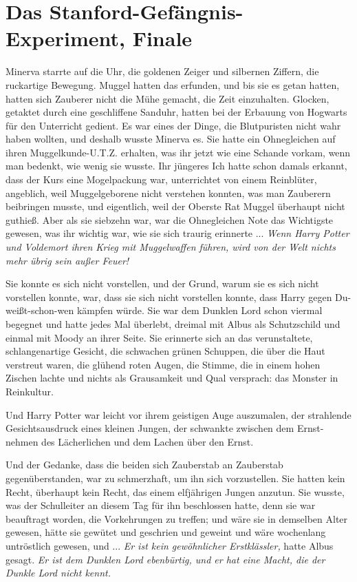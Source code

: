 \chapter{Das Stanford-Gefängnis-Experiment, Finale}

Minerva starrte auf die Uhr, die goldenen Zeiger und silbernen Ziffern, die
ruckartige Bewegung. Muggel hatten das erfunden, und bis sie es getan hatten,
hatten sich Zauberer nicht die Mühe gemacht, die Zeit einzuhalten. Glocken,
getaktet durch eine geschliffene Sanduhr, hatten bei der Erbauung von Hogwarts
für den Unterricht gedient. Es war eines der Dinge, die Blutpuristen nicht wahr
haben wollten, und deshalb wusste Minerva es. Sie hatte ein \glqq{}
Ohnegleichen\grqq{} auf ihren Muggelkunde-U.T.Z. erhalten, was ihr jetzt wie
eine Schande vorkam, wenn man bedenkt, wie wenig sie wusste. Ihr jüngeres Ich
hatte schon damals erkannt, dass der Kurs eine Mogelpackung war, unterrichtet
von einem Reinblüter, angeblich, weil Muggelgeborene nicht verstehen konnten,
was man Zauberern beibringen musste, und eigentlich, weil der Oberste Rat Muggel
überhaupt nicht guthieß. Aber als sie siebzehn war, war die Ohnegleichen Note
das Wichtigste gewesen, was ihr wichtig war, wie sie sich traurig erinnerte ...
\emph{Wenn Harry Potter und Voldemort ihren Krieg mit Muggelwaffen führen, wird
von der Welt nichts mehr übrig sein außer Feuer!}

Sie konnte es sich nicht vorstellen, und der Grund, warum sie es sich nicht
vorstellen konnte, war, dass sie sich nicht vorstellen konnte, dass Harry gegen
Du-weißt-schon-wen kämpfen würde. Sie war dem Dunklen Lord schon viermal
begegnet und hatte jedes Mal überlebt, dreimal mit Albus als Schutzschild und
einmal mit Moody an ihrer Seite. Sie erinnerte sich an das verunstaltete,
schlangenartige Gesicht, die schwachen grünen Schuppen, die über die Haut
verstreut waren, die glühend roten Augen, die Stimme, die in einem hohen Zischen
lachte und nichts als Grausamkeit und Qual versprach: das Monster in Reinkultur.

Und Harry Potter war leicht vor ihrem geistigen Auge auszumalen, der strahlende
Gesichtsausdruck eines kleinen Jungen, der schwankte zwischen dem Ernst-nehmen
des Lächerlichen und dem Lachen über den Ernst.

Und der Gedanke, dass die beiden sich Zauberstab an Zauberstab gegenüberstanden,
war zu schmerzhaft, um ihn sich vorzustellen. Sie hatten kein Recht, überhaupt
kein Recht, das einem elfjährigen Jungen anzutun. Sie wusste, was der
Schulleiter an diesem Tag für ihn beschlossen hatte, denn sie war beauftragt
worden, die Vorkehrungen zu treffen; und wäre sie in demselben Alter gewesen,
hätte sie gewütet und geschrien und geweint und wäre wochenlang untröstlich
gewesen, und ... \emph{Er ist kein gewöhnlicher Erstklässler,} hatte Albus
gesagt. \emph{Er ist dem Dunklen Lord ebenbürtig, und er hat eine Macht, die der
Dunkle Lord nicht kennt.}

